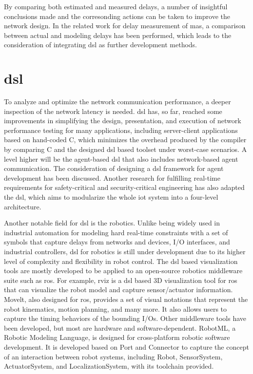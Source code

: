By comparing both estimated and measured delays, a number of insightful 
conclusions made and the corresonding actions can be taken to improve 
the network design.
In the related work for delay measurement of \gls{mas}, 
a comparison between actual and modeling 
delays has been performed\cite{vogel-heuser_delay_2023}, which leads to the 
consideration of integrating \gls{dsl} as further development methods.





\section{\gls{dsl}}
To analyze and optimize the network communication performance, a deeper 
inspection of the network latency is needed. \gls{dsl} has, so far, reached 
some improvements in simplifying the design, presentation, and execution of 
network performance testing for many applications, including server-client applications 
based on hand-coded C, which minimizes the overhead produced by the compiler by 
comparing C and the designed \gls{dsl} based toolset under worst-case scenarios.
A level higher will be the agent-based \gls{dsl} that also includes network-based 
agent communication. The consideration of designing a \gls{dsl} framework 
for agent development has been discussed\cite{judith_domain_2013}. Another 
research for fulfilling real-time requirements for safety-critical and 
security-critical engineering has also adapted the \gls{dsl}, which aims to 
modularize the whole \gls{iot} system into a four-level architecture\cite{sklyar_domain_2022}. 



Another notable field for \gls{dsl} is the robotics. Unlike being widely 
used in industrial automation for modeling hard real-time constraints with 
a set of symbols that capture delays from networks and devices, I/O interfaces, 
and industrial controllers\cite{hujo_toward_2022}, \gls{dsl} for robotics is still 
under development due to its higher level of complexity and flexibility in 
robot control. The \gls{dsl} based visualization tools are mostly developed 
to be applied to an open-source robotics middleware suite such as \gls{ros}. 
For example, \gls{rviz} is a \gls{dsl} based 3D 
visualization tool for \gls{ros} that can visualize the robot model and 
capture sensor/actuator information. Movelt, also designed for \gls{ros}, 
provides a set of visual notations that represent the robot kinematics, 
motion planning, and many more. It also allows users to capture the 
timing behaviors of the bounding I/Os. Other middleware tools have been 
developed, but most are hardware and software-dependent. RobotML, a 
Robotic Modeling Language, is designed for cross-platform robotic 
software development\cite{hutchison_robotml_2012}. It is developed 
based on Port and Connector to
capture the concept of an interaction between robot systems, including 
Robot, SensorSystem, ActuatorSystem, and LocalizationSystem, with its toolchain 
provided\cite[fig.5]{hutchison_robotml_2012}.



